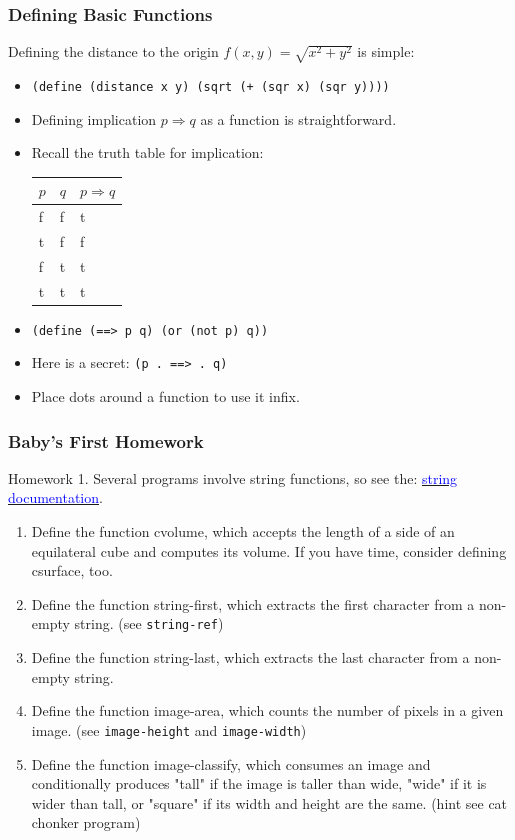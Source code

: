 \documentclass{beamer}
\begin{document}
\begin{frame}
  \frametitle{Defining Basic Functions}
  Defining the distance to the origin $f(x, y) = \sqrt{x^2 + y^2}$ is simple:
  \begin{itemize}
  \item<2-> \texttt{(define (distance x y) (sqrt (+ (sqr x) (sqr y))))}
  \item<3-> Defining implication $p \Rightarrow q$ as a function is straightforward.
  \item<4-> Recall the truth table for implication:\\
      \begin{tabular}{ l | l | l }
      $p$ & $q$ & $p \Rightarrow q$ \\ \hline
      f & f & t\\
      t & f & f\\
      f & t & t\\
      t & t & t\\
    \end{tabular}
  \item<5-> \texttt{(define (==> p q) (or (not p) q))}
  \item<6-> Here is a secret: \texttt{(p . ==> . q)}
  \item<7-> Place dots around a function to use it infix.    
  \end{itemize}
\end{frame}


\begin{frame}
  \frametitle{Baby's First Homework}
  Homework 1. Several programs involve string functions, so see the: \href{https://docs.racket-lang.org/reference/strings.html}{\textcolor{blue}{string documentation}}.
  \begin{enumerate}
  \item Define the function cvolume, which accepts the length of a side of an equilateral cube and computes its volume. If you have time, consider defining csurface, too.
  \item Define the function string-first, which extracts the first character from a non-empty string. (see \texttt{string-ref})
  \item Define the function string-last, which extracts the last character from a non-empty string. 
  \item Define the function image-area, which counts the number of pixels in a given image. (see \texttt{image-height} and \texttt{image-width})
  \item Define the function image-classify, which consumes an image and conditionally produces "tall" if the image is taller than wide, "wide" if it is wider than tall, or "square" if its width and height are the same. (hint see cat chonker program)  
  \end{enumerate}
\end{frame}
\end{document}
